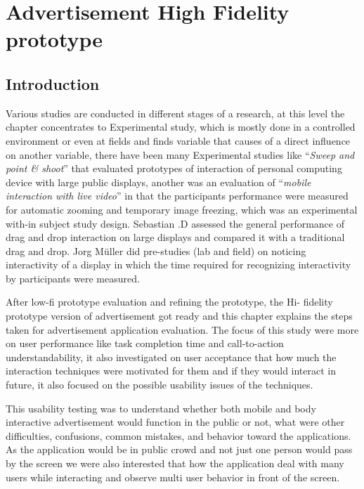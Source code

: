 \chapter{Advertisement High Fidelity prototype} %

\label{Chapter6} %

\newpage

\section{Introduction}


Various studies are conducted in different stages of a research, at this level the chapter concentrates to Experimental study, which is mostly done in a controlled environment or even at fields and finds variable that causes of a direct influence on another variable, there have been many Experimental studies like ``\emph{Sweep and point \& shoot}'' \cite{SweepPointShoot} that evaluated prototypes of interaction of personal computing device with large public displays, another was an evaluation of ``\emph{mobile interaction with live video}'' \cite{TouchProjector} in that the participants performance were measured for automatic zooming and temporary image freezing, which was an experimental with-in subject study design. Sebastian .D \cite{WalldragandDrop} assessed the general performance of drag and drop interaction on large displays and compared it with a traditional drag and drop. Jorg Müller \cite{LookingGlass} did pre-studies (lab and field) on noticing interactivity of a display in which the time required for recognizing interactivity by participants were measured.

After low-fi prototype evaluation and refining the prototype, the Hi- fidelity prototype version of advertisement got ready and this chapter explains the steps taken for advertisement application evaluation. The focus of this study were more on user performance like task completion time and call-to-action \cite{call-to-action} understandability, it also investigated on user acceptance that how much the interaction techniques were motivated for them and if they would interact in future, it also focused on the possible usability issues of the techniques.

This usability testing was to understand whether both mobile and body interactive advertisement would function in the public or not, what were other difficulties, confusions, common mistakes, and behavior toward the applications. As the application would be in public crowd and not just one person would pass by the screen we were also interested that how the application deal with many users while interacting and observe multi user behavior in front of the screen.


